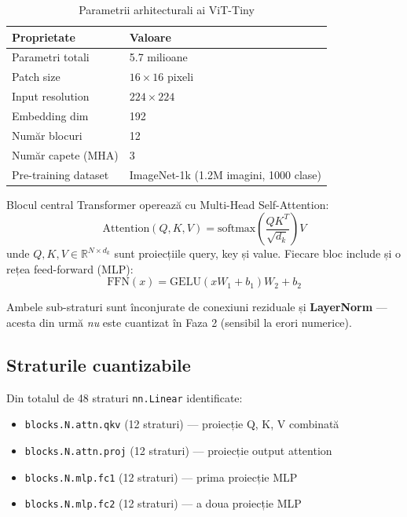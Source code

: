 \documentclass[12pt,a4paper]{article}
\begin{document}
\begin{table}[H]
  \centering
  \caption{Parametrii arhitecturali ai ViT-Tiny}
  \begin{tabular}{ll}
    \toprule
    \textbf{Proprietate} & \textbf{Valoare} \\
    \midrule
    Parametri totali    & 5.7 milioane \\
    Patch size          & $16 \times 16$ pixeli \\
    Input resolution    & $224 \times 224$ \\
    Embedding dim       & 192 \\
    Număr blocuri       & 12 \\
    Număr capete (MHA)  & 3 \\
    Pre-training dataset & ImageNet-1k (1.2M imagini, 1000 clase) \\
    \bottomrule
  \end{tabular}
  \label{tab:vit_config}
\end{table}

Blocul central Transformer operează cu Multi-Head Self-Attention:
\begin{equation}
  \mathrm{Attention}(Q, K, V) = \mathrm{softmax}\!\left(\frac{QK^T}{\sqrt{d_k}}\right) V
\end{equation}
unde $Q, K, V \in \mathbb{R}^{N \times d_k}$ sunt proiecțiile query, key și value.
Fiecare bloc include și o rețea feed-forward (MLP):
\begin{equation}
  \mathrm{FFN}(x) = \mathrm{GELU}(xW_1 + b_1)W_2 + b_2
\end{equation}

Ambele sub-straturi sunt înconjurate de conexiuni reziduale și \textbf{LayerNorm}
--- acesta din urmă \emph{nu} este cuantizat în Faza 2 (sensibil la erori numerice).

\subsection{Straturile cuantizabile}

Din totalul de 48 straturi \texttt{nn.Linear} identificate:
\begin{itemize}
  \item \texttt{blocks.N.attn.qkv} (12 straturi) --- proiecție Q, K, V combinată
  \item \texttt{blocks.N.attn.proj} (12 straturi) --- proiecție output attention
  \item \texttt{blocks.N.mlp.fc1} (12 straturi) --- prima proiecție MLP
  \item \texttt{blocks.N.mlp.fc2} (12 straturi) --- a doua proiecție MLP
\end{itemize}
\end{document}
